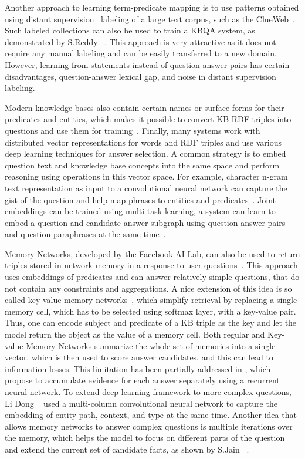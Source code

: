 Another approach to learning term-predicate mapping is to use patterns obtained using distant supervision~\cite{MintzBSJ09} labeling of a large text corpus, such as the ClueWeb~\cite{yao2014freebase}.
Such labeled collections can also be used to train a KBQA system, as demonstrated by S.Reddy \etal~\cite{ReddyLS14,reddy2016transforming}.
This approach is very attractive as it does not require any manual labeling and can be easily transferred to a new domain.
However, learning from statements instead of question-answer pairs has certain disadvantages, \eg question-answer lexical gap, and noise in distant supervision labeling.

Modern knowledge bases also contain certain names or surface forms for their predicates and entities, which makes it possible to convert KB RDF triples into questions and use them for training~\cite{BordesCW14:emnlp}.
Finally, many systems work with distributed vector representations for words and RDF triples and use various deep learning techniques for answer selection.
A common strategy is to embed question text and knowledge base concepts into the same space and perform reasoning using operations in this vector space.
For example, character n-gram text representation as input to a convolutional neural network can capture the gist of the question and help map phrases to entities and predicates~\cite{yih2014semantic}.
Joint embeddings can be trained using multi-task learning, \eg a system can learn to embed a question and candidate answer subgraph using question-answer pairs and question paraphrases at the same time~\cite{BordesCW14:emnlp}.

Memory Networks, developed by the Facebook AI Lab, can also be used to return triples stored in network memory in a response to user questions~\cite{bordes2015large}.
This approach uses embeddings of predicates and can answer relatively simple questions, that do not contain any constraints and aggregations.
A nice extension of this idea is so called key-value memory networks~\cite{miller2016key}, which simplify retrieval by replacing a single memory cell, which has to be selected using softmax layer, with a key-value pair.
Thus, one can encode subject and predicate of a KB triple as the key and let the model return the object as the value of a memory cell.
Both regular and Key-value Memory Networks summarize the whole set of memories into a single vector, which is then used to score answer candidates, and this can lead to information losses.
This limitation has been partially addressed in \cite{henaff2016tracking,wang2016reading}, which propose to accumulate evidence for each answer separately using a recurrent neural network.
To extend deep learning framework to more complex questions, Li Dong \etal~\cite{dong2015question} used a multi-column convolutional neural network to capture the embedding of entity path, context, and type at the same time.
Another idea that allows memory networks to answer complex questions is multiple iterations over the memory, which helps the model to focus on different parts of the question and extend the current set of candidate facts, as shown by S.Jain \etal~\cite{jain2016question}.

